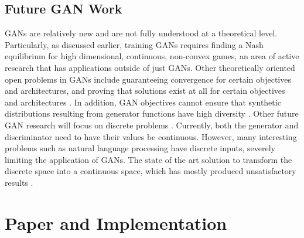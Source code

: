 \documentclass{article}
\begin{document}
\subsection{Future GAN Work}
GANs are relatively new and are not fully understood at a theoretical level. Particularly, as discussed earlier, training GANs requires finding a Nash equilibrium for high dimensional, continuous, non-convex games, an area of active research that has applications outside of just GANs. Other theoretically oriented open problems in GANs include guaranteeing convergence for certain objectives and architectures, and proving that solutions exist at all for certain objectives and architectures \citep{Arora17}. In addition, GAN objectives cannot ensure that synthetic distributions resulting from generator functions have high diversity \citep{Arora17}. Other future GAN research will focus on discrete problems \citep{Che+al-2017-augmented}. Currently, both the generator and discriminator need to have their values be continuous. However, many interesting problems such as natural language processing have discrete inputs, severely limiting the application of GANs. The state of the art solution to transform the discrete space into a continuous space, which has mostly produced unsatisfactory results \citep{Che+al-2017-augmented}.

\section{Paper and Implementation}
\end{document}
